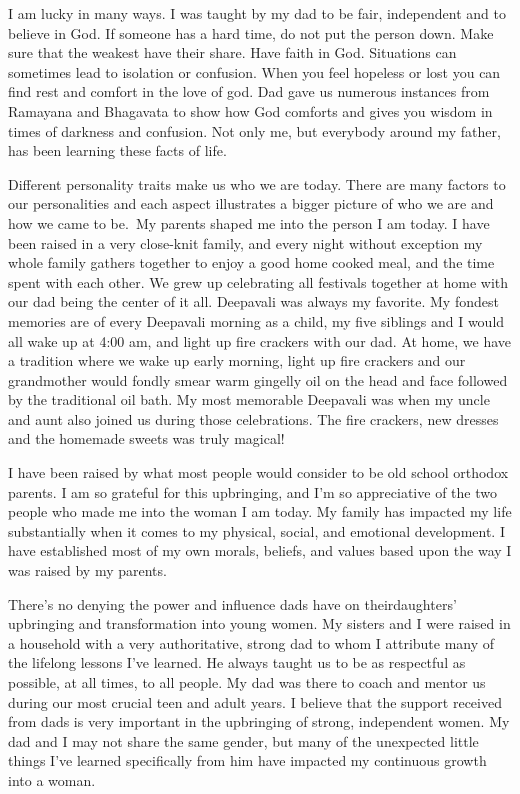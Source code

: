 I am lucky in many ways. I was taught by my dad to be fair, independent and to believe in God. If someone has a hard time, do not put the person down. Make sure that the weakest have their share. Have faith in God. Situations can sometimes lead to isolation or confusion. When you feel hopeless or lost you can find rest and comfort in the love of god. Dad gave us numerous instances from Ramayana and Bhagavata to show how God comforts and gives you wisdom in times of darkness and confusion. Not only me, but everybody around my father, has been learning these facts of life.

Different personality traits make us who we are today. There are many factors to our personalities and each aspect illustrates a bigger picture of who we are and how we came to be. My parents shaped me into the person I am today. I have been raised in a very close-knit family, and every night without exception my whole family gathers together to enjoy a good home cooked meal, and the time spent with each other. We grew up celebrating all festivals together at home with our dad being the center of it all. Deepavali was always my favorite. My fondest memories are of every Deepavali morning as a child, my five siblings and I would all wake up at 4:00 am, and light up fire crackers with our dad. At home, we have a tradition where we wake up early morning, light up fire crackers and our grandmother would fondly smear warm gingelly oil on the head and face followed by the traditional oil bath. My most memorable Deepavali was when my uncle and aunt also joined us during those celebrations. The fire crackers, new dresses and the homemade sweets was truly magical! 

I have been raised by what most people would consider to be old school orthodox parents. I am so grateful for this upbringing, and I'm so appreciative of the two people who made me into the woman I am today. My family has impacted my life substantially when it comes to my physical, social, and emotional development. I have established most of my own morals, beliefs, and values based upon the way I was raised by my parents.
\newpage

There’s no denying the power and influence dads have on their\break daughters’ upbringing and transformation into young women. My sisters and I were raised in a household with a very authoritative, strong dad to whom I attribute many of the lifelong lessons I’ve learned. He always taught us to be as respectful as possible, at all times, to all people. My dad was there to coach and mentor us during our most crucial teen and adult years. I believe that the support received from dads is very important in the upbringing of strong, independent women. My dad and I may not share the same gender, but many of the unexpected little things I've learned specifically from him have impacted my continuous growth into a woman.

